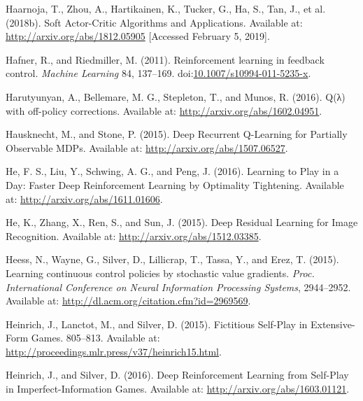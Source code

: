 \documentclass[
  letterpaper,
  DIV=11,
  numbers=noendperiod]{scrreprt}
\newlength{\cslhangindent}
\newlength{\cslentryspacingunit} %
\newenvironment{CSLReferences}[2] %
 {%
  \setlength{\parindent}{0pt}
  \ifodd #1
  \let\oldpar\par
  \def\par{\hangindent=\cslhangindent\oldpar}
  \fi
  \setlength{\parskip}{#2\cslentryspacingunit}
 }%
 {}
\begin{document}
\begin{CSLReferences}{1}{0}
\leavevmode{}%
Haarnoja, T., Zhou, A., Hartikainen, K., Tucker, G., Ha, S., Tan, J., et
al. (2018b). Soft {Actor-Critic Algorithms} and {Applications}.
Available at: \url{http://arxiv.org/abs/1812.05905} {[}Accessed February
5, 2019{]}.

\leavevmode{}%
Hafner, R., and Riedmiller, M. (2011). Reinforcement learning in
feedback control. \emph{Machine Learning} 84, 137--169.
doi:\href{https://doi.org/10.1007/s10994-011-5235-x}{10.1007/s10994-011-5235-x}.

\leavevmode{}%
Harutyunyan, A., Bellemare, M. G., Stepleton, T., and Munos, R. (2016).
Q(λ) with off-policy corrections. Available at:
\url{http://arxiv.org/abs/1602.04951}.

\leavevmode{}%
Hausknecht, M., and Stone, P. (2015). Deep {Recurrent Q-Learning} for
{Partially Observable MDPs}. Available at:
\url{http://arxiv.org/abs/1507.06527}.

\leavevmode{}%
He, F. S., Liu, Y., Schwing, A. G., and Peng, J. (2016). Learning to
{Play} in a {Day}: {Faster Deep Reinforcement Learning} by {Optimality
Tightening}. Available at: \url{http://arxiv.org/abs/1611.01606}.

\leavevmode{}%
He, K., Zhang, X., Ren, S., and Sun, J. (2015). Deep {Residual Learning}
for {Image Recognition}. Available at:
\url{http://arxiv.org/abs/1512.03385}.

\leavevmode{}%
Heess, N., Wayne, G., Silver, D., Lillicrap, T., Tassa, Y., and Erez, T.
(2015). Learning continuous control policies by stochastic value
gradients. \emph{Proc. International Conference on Neural Information
Processing Systems}, 2944--2952. Available at:
\url{http://dl.acm.org/citation.cfm?id=2969569}.

\leavevmode{}%
Heinrich, J., Lanctot, M., and Silver, D. (2015). Fictitious {Self-Play}
in {Extensive-Form Games}. 805--813. Available at:
\url{http://proceedings.mlr.press/v37/heinrich15.html}.

\leavevmode{}%
Heinrich, J., and Silver, D. (2016). Deep {Reinforcement Learning} from
{Self-Play} in {Imperfect-Information Games}. Available at:
\url{http://arxiv.org/abs/1603.01121}.


\end{CSLReferences}
\end{document}
